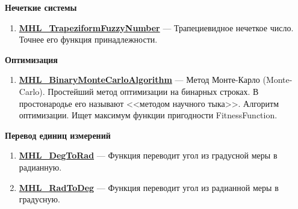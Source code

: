 \documentclass[a4paper,12pt]{article}
\begin{document}
\textbf{Нечеткие системы}
\begin{enumerate}

\item \textbf{\hyperref[MHL_TrapeziformFuzzyNumber]{MHL\_TrapeziformFuzzyNumber}} --- Трапециевидное нечеткое число. Точнее его функция принадлежности.

\end{enumerate}

\textbf{Оптимизация}
\begin{enumerate}

\item \textbf{\hyperref[MHL_BinaryMonteCarloAlgorithm]{MHL\_BinaryMonteCarloAlgorithm}} --- Метод Монте-Карло (Monte-Carlo). Простейший метод оптимизации на бинарных строках. В простонародье его называют <<методом научного тыка>>. Алгоритм оптимизации. Ищет максимум функции пригодности FitnessFunction.

\end{enumerate}

\textbf{Перевод единиц измерений}
\begin{enumerate}

\item \textbf{\hyperref[MHL_DegToRad]{MHL\_DegToRad}} --- Функция переводит угол из градусной меры в радианную.

\item \textbf{\hyperref[MHL_RadToDeg]{MHL\_RadToDeg}} --- Функция переводит угол из радианной меры в градусную.

\end{enumerate}
\end{document}
